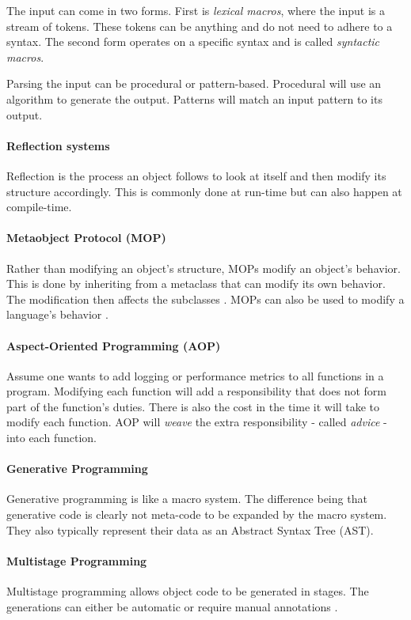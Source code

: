 The input can come in two forms.
First is \textit{lexical macros}, where the input is a stream of tokens.
These tokens can be anything and do not need to adhere to a syntax.
The second form operates on a specific syntax and is called \textit{syntactic macros}.

Parsing the input can be procedural or pattern-based.
Procedural will use an algorithm to generate the output.
Patterns will match an input pattern to its output.

\paragraph{Reflection systems}
Reflection is the process an object follows to look at itself and then modify its structure accordingly.
This is commonly done at run-time but can also happen at compile-time.

\paragraph{Metaobject Protocol (MOP)}
Rather than modifying an object's structure, MOPs modify an object's behavior.
This is done by inheriting from a metaclass that can modify its own behavior.
The modification then affects the subclasses \cite{lee_95_01}.
MOPs can also be used to modify a language's behavior \cite{seaton_15_01}.

\paragraph{Aspect-Oriented Programming (AOP)}
Assume one wants to add logging or performance metrics to all functions in a program.
Modifying each function will add a responsibility that does not form part of the function's duties.
There is also the cost in the time it will take to modify each function.
AOP will \textit{weave} the extra responsibility - called \textit{advice} - into each function.

\paragraph{Generative Programming}
Generative programming is like a macro system.
The difference being that generative code is clearly not meta-code to be expanded by the macro system.
They also typically represent their data as an Abstract Syntax Tree (AST). 

\paragraph{Multistage Programming}
Multistage programming allows object code to be generated in stages.
The generations can either be automatic or require manual annotations \cite{sheard_01_01, taha_04_01}.

